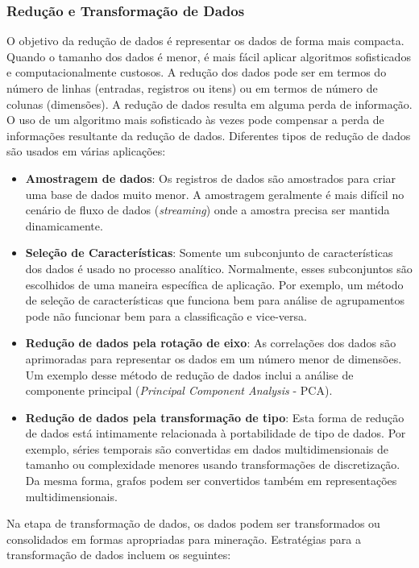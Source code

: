 \subsubsection{Redução e Transformação de Dados}
O objetivo da redução de dados é representar os dados de forma mais compacta. Quando o tamanho dos dados é menor, é mais fácil aplicar algoritmos sofisticados e computacionalmente custosos. A redução dos dados pode ser em termos do número de linhas (entradas, registros ou itens) ou em termos de número de colunas (dimensões). A redução de dados resulta em alguma perda de informação. O uso de um algoritmo mais sofisticado às vezes pode compensar a perda de informações resultante da redução de dados. Diferentes tipos de redução de dados são usados em várias aplicações:

\begin{itemize}
  \item 
\textbf{Amostragem de dados}: Os registros de dados são amostrados para criar uma base de dados muito menor. A amostragem geralmente é mais difícil no cenário de fluxo de dados (\textit{streaming}) onde a amostra precisa ser mantida dinamicamente.
  \item 
\textbf{Seleção de Características}: Somente um subconjunto de características dos dados é usado no processo analítico. Normalmente, esses subconjuntos são escolhidos de uma maneira específica de aplicação. Por exemplo, um método de seleção de características que funciona bem para análise de agrupamentos pode não funcionar bem para a classificação e vice-versa.
  \item 
\textbf{Redução de dados pela rotação de eixo}: As correlações dos dados são aprimoradas para representar os dados em um número menor de dimensões. Um exemplo desse método de redução de dados inclui a análise de componente principal (\textit{Principal Component Analysis }- PCA).
  \item 
\textbf{Redução de dados pela transformação de tipo}: Esta forma de redução de dados está intimamente relacionada à portabilidade de tipo de dados. Por exemplo, séries temporais são convertidas em dados multidimensionais de tamanho ou complexidade menores usando transformações de discretização. Da mesma forma, grafos podem ser convertidos também em representações multidimensionais.
\end{itemize}

Na etapa de transformação de dados, os dados podem ser transformados ou consolidados em formas apropriadas para mineração. Estratégias para a transformação de dados incluem os seguintes:

